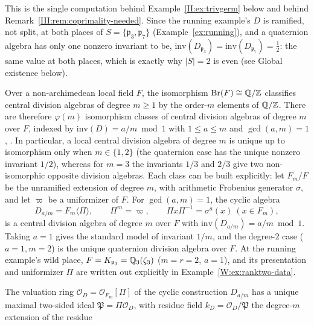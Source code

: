 \begin{description}
This is the single computation behind Example~\ref{II:ex:trivgerm}
below and behind Remark~\ref{III:rem:coprimality-needed}. Since the
running example's $D$ is ramified, not split, at both places of
$S=\{\mathfrak p_3,\mathfrak p_7\}$ (Example~\ref{ex:running}), and a
quaternion algebra has only one nonzero invariant to be,
$\mathrm{inv}(D_{\mathfrak p_3})=\mathrm{inv}(D_{\mathfrak p_7})=\tfrac12$:
the same value at both places, which is exactly why $|S|=2$ is even
(see Global existence below).
\item[Local classification; the cyclic construction] Over a
non-archimedean local field $F$, the isomorphism $\mathrm{Br}(F)\cong\mathbb{Q}/\mathbb Z$
classifies central division algebras of degree $m\ge1$ by the
order-$m$ elements of $\mathbb{Q}/\mathbb Z$. There are therefore $\varphi(m)$
isomorphism classes of central division algebras of degree $m$ over
$F$, indexed by $\mathrm{inv}(D)=a/m\bmod1$ with $1\le a\le m$ and
$\gcd(a,m)=1$ \cite[Ch.~XIII]{Ser79}, \cite[\S31]{Rei75}. In
particular, a local central division algebra of degree $m$ is unique
up to isomorphism only when $m\in\{1,2\}$ (the quaternion case has the
unique nonzero invariant $1/2$), whereas for $m=3$ the invariants
$1/3$ and $2/3$ give two non-isomorphic opposite division algebras.
Each class can be built explicitly: let $F_m/F$ be the unramified
extension of degree $m$, with arithmetic Frobenius generator $\sigma$,
and let $\varpi$ be a uniformizer of $F$. For $\gcd(a,m)=1$, the
cyclic algebra
\[
D_{a/m}=F_m\langle\Pi\rangle,\qquad \Pi^m=\varpi,\qquad \Pi x\Pi^{-1}=\sigma^a(x)\ (x\in F_m),
\]
is a central division algebra of degree $m$ over $F$ with
$\mathrm{inv}(D_{a/m})=a/m\bmod1$. Taking $a=1$ gives the standard
model of invariant $1/m$, and the degree-$2$ case ($a=1,m=2$) is the
unique quaternion division algebra over $F$. At the running example's
wild place, $F=K_{\mathfrak p_3}=\mathbb{Q}_3(\zeta_3)$ ($m=r=2$, $a=1$), and
its presentation and uniformizer $\Pi$ are written out explicitly in
Example~\ref{W:ex:ranktwo-data}.
\item[Congruence filtration and level] The
valuation ring $\mathcal O_D=\mathcal
O_{F_m}[\Pi]$ of the cyclic construction $D_{a/m}$ has
a unique maximal two-sided ideal $\mathfrak P=\Pi\mathcal O_D$, with residue
field $k_D=\mathcal O_D/\mathfrak P$ the degree-$m$ extension of the residue

\end{description}
